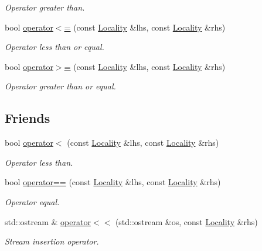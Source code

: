 \begin{DoxyCompactItemize}
\begin{DoxyCompactList}\small\item\em Operator greater than. \end{DoxyCompactList}\item 
bool \hyperlink{classshad_1_1rt_1_1Locality_ac06cab6087d38235da74aaed42e7022e}{operator$<$=} (const \hyperlink{classshad_1_1rt_1_1Locality}{Locality} \&lhs, const \hyperlink{classshad_1_1rt_1_1Locality}{Locality} \&rhs)
\begin{DoxyCompactList}\small\item\em Operator less than or equal. \end{DoxyCompactList}\item 
bool \hyperlink{classshad_1_1rt_1_1Locality_a86537d57693107caf26f7e813419f069}{operator$>$=} (const \hyperlink{classshad_1_1rt_1_1Locality}{Locality} \&lhs, const \hyperlink{classshad_1_1rt_1_1Locality}{Locality} \&rhs)
\begin{DoxyCompactList}\small\item\em Operator greater than or equal. \end{DoxyCompactList}\end{DoxyCompactItemize}
\subsection*{Friends}
\begin{DoxyCompactItemize}
\item 
bool \hyperlink{classshad_1_1rt_1_1Locality_aa2af2d26e5ccf12173f47700f758ef33}{operator$<$} (const \hyperlink{classshad_1_1rt_1_1Locality}{Locality} \&lhs, const \hyperlink{classshad_1_1rt_1_1Locality}{Locality} \&rhs)
\begin{DoxyCompactList}\small\item\em Operator less than. \end{DoxyCompactList}\item 
bool \hyperlink{classshad_1_1rt_1_1Locality_a5b49a8d953521ff207ca55d2b6c9d398}{operator==} (const \hyperlink{classshad_1_1rt_1_1Locality}{Locality} \&lhs, const \hyperlink{classshad_1_1rt_1_1Locality}{Locality} \&rhs)
\begin{DoxyCompactList}\small\item\em Operator equal. \end{DoxyCompactList}\item 
std\-::ostream \& \hyperlink{classshad_1_1rt_1_1Locality_af75b1b561cda1bea25ef3c2ff024e066}{operator$<$$<$} (std\-::ostream \&os, const \hyperlink{classshad_1_1rt_1_1Locality}{Locality} \&rhs)
\begin{DoxyCompactList}\small\item\em Stream insertion operator. \end{DoxyCompactList}\end{DoxyCompactItemize}


